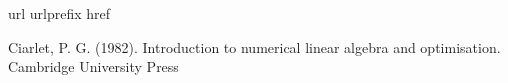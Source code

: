 \documentclass[a4paper,10pt]{scrartcl}
\numberwithin{equation}{section}
\begin{document}




\newpage
\begin{thebibliography}{10}
  \expandafter\ifx\csname url\endcsname\relax
  \def\url#1{\texttt{#1}}\fi
  \expandafter\ifx\csname urlprefix\endcsname\relax\def\urlprefix{URL }\fi
  \expandafter\ifx\csname href\endcsname\relax
  \def\href#1#2{#2} \def\path#1{#1}\fi

  Ciarlet, P. G. (1982).
  Introduction to numerical linear algebra and optimisation.
  Cambridge University Press

\end{thebibliography}
\end{document}
